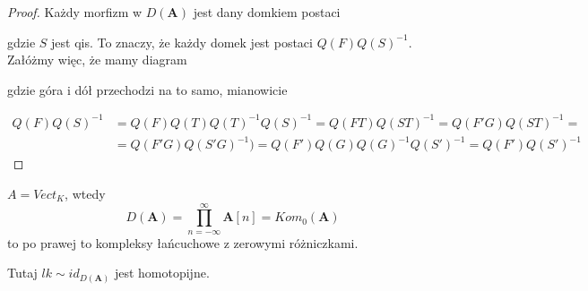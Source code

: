 \begin{proof}
  Każdy morfizm w $D(\mathbf{A})$ jest dany domkiem postaci 
  \begin{center}\end{center}
  gdzie $S$ jest qis. To znaczy, że każdy domek jest postaci $Q(F)Q(S)^{-1}$. Załóżmy więc, że mamy diagram
  \begin{center}\end{center}
  gdzie góra i dół przechodzi na to samo, mianowicie
  \begin{center}\end{center}
  \begin{align*}
    Q(F)Q(S)^{-1}&=Q(F)Q(T)Q(T)^{-1}Q(S)^{-1}=Q(FT)Q(ST)^{-1}=Q(F'G)Q(ST)^{-1}= \\ 
                 &=Q(F'G)Q(S'G)^{-1})=Q(F')Q(G)Q(G)^{-1}Q(S')^{-1}=Q(F')Q(S')^{-1}
  \end{align*}
\end{proof}

\begin{example}
\item $A=Vect_K$, wtedy 
  $$D(\mathbf{A})=\prod_{n=-\infty}^\infty \mathbf{A}[n]=Kom_0(\mathbf{A})$$
  to po prawej to kompleksy łańcuchowe z zerowymi różniczkami.

  \begin{center}\end{center}
  Tutaj $lk\sim id_{D(\mathbf{A})}$ jest homotopijne.
\end{example}

